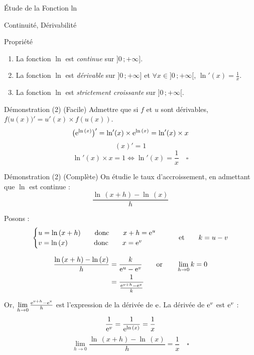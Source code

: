 \documentclass{coursbook}
\begin{document}
    \begin{Gpartie}{Étude de la Fonction ln}
        \begin{Spartie}{Continuité, Dérivabilité}
            \begin{SSpartie}{Propriété}
                \begin{enumerate}[(1)]
                    \item La fonction $\ln$ est \emph{continue} sur $\big]0\,;+\infty\big]$.
                    \item La fonction $\ln$ est \emph{dérivable} sur $\big]0\,;+\infty\big]$ et $\forall x\in\big]0\,;+\infty\big[$, $\boxed{\ln'(x)=\frac{1}{x}}$.
                    \item La fonction $\ln$ est \emph{strictement croissante} sur $\big]0\,;+\infty\big[$.
                \end{enumerate}
                \begin{SSSpartie}{Démonstration (2) (Facile)}
                    Admettre que si $f$ et $u$ sont dérivables, $f\big(u(x)\big)'=u'(x)\times f(u(x))$.
                    \[\big(\mathrm{e}^{\ln\,(x)}\big)'=\ln'(x)\times \mathrm{e}^{\ln\,(x)}=\ln'(x)\times x\]
                    \[(x)'=1\]
                    \[\ln'(x)\times x=1\iff\ln'(x)=\frac{1}{x}\quad\square\]
                    
                \end{SSSpartie}
                \begin{SSSpartie}{Démonstration (2) (Complète)} 
                    On étudie le taux d'accroissement, en admettant que $\ln$ est continue :
                    \[\frac{\ln\,(x+h)-\ln\,(x)}{h}\]

                    Posons :
                    \[\begin{cases}
                        u=\ln\,(x+h)\qquad\text{donc}\qquad x+h=\mathrm{e}^u \\ v=\ln\,(x)\phantom{+h)}\text{\qquad donc\qquad} x=\mathrm{e}^v
                    \end{cases}\qquad\text{et}\qquad k=u-v\]

                    \[\begin{aligned}[t]
                        \frac{\ln\,(x+h)-\ln\,(x)}{h}&=\frac{k}{\me^u-\me^v}\qquad\text{or}\qquad\lim_{h\to0}k=0 \\
                        &=\frac{1}{\frac{\me^{v+h}-\me^v}{k}}
                    \end{aligned}\]

                    Or, $\lim\limits_{h\to0}\frac{\me^{v+h}-\me^v}{h}$ est l'expression de la dérivée de $\mathrm{e}$. La dérivée de $\mathrm{e}^v$ est $\mathrm{e}^v$ :
                    \[\frac{1}{\me^v}=\frac{1}{\me^{\ln\,(x)}}=\frac{1}{x}\]
                    \[\lim\limits_{h\to 0}\frac{\ln\,(x+h)-\ln\,(x)}{h}=\frac{1}{x}\quad\square\]


\end{SSSpartie}
\end{SSpartie}
\end{Spartie}
\end{Gpartie}
\end{document}
